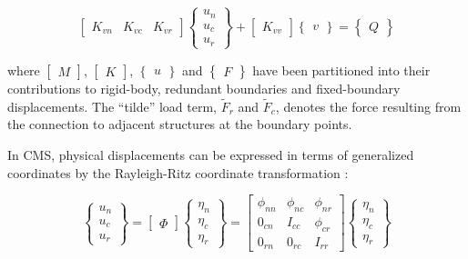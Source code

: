 \documentclass{ifacconf}
\begin{document}
\begin{equation}
\label{eq:generalPiezo2divided}
\begin{bmatrix} K_{v n} & K_{v c} & K_{v r}  \end{bmatrix} \begin{Bmatrix} u_n \\ u_c \\ u_r  \end{Bmatrix} + \begin{bmatrix} K_{vv} \end{bmatrix} \begin{Bmatrix} v \end{Bmatrix} = \begin{Bmatrix} Q \end{Bmatrix}
\end{equation}
\normalsize

where $\begin{bmatrix} M \end{bmatrix}$, $ \begin{bmatrix} K \end{bmatrix}$, $\begin{Bmatrix} u \end{Bmatrix}$ and  $\begin{Bmatrix} F \end{Bmatrix}$ have been partitioned into their contributions to rigid-body, redundant boundaries and fixed-boundary displacements. The ``tilde'' load term, $\tilde{F}_r$ and $\tilde{F}_c$, denotes the force resulting from the connection to adjacent structures at the boundary points.

In CMS, physical displacements can be expressed in terms of generalized coordinates by the Rayleigh-Ritz coordinate transformation \cite{Craig2000_CB}:

\begin{equation}
\label{eq:phi}
\begin{Bmatrix} u_n\\ u_c \\u_r \end{Bmatrix} = \begin{bmatrix}\Phi \end{bmatrix} \begin{Bmatrix} \eta_n\\ \eta_c \\ \eta_r \end{Bmatrix}  = \begin{bmatrix}
\phi_{nn} & \phi_{nc} & \phi_{nr} \\ 0_{cn} & I_{cc} & \phi_{cr} \\ 0_{rn} & 0_{rc} & I_{rr}
\end{bmatrix} \begin{Bmatrix} \eta_n\\ \eta_c \\ \eta_r \end{Bmatrix}
\end{equation}
\end{document}
